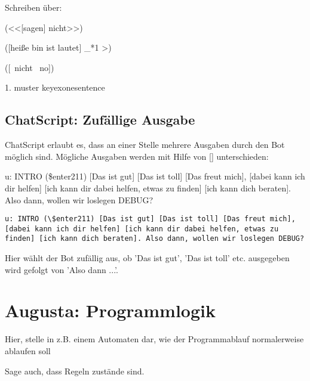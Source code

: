 Schreiben über:

(<<[sagen] nicht>>)

([heiße bin ist lautet] _*1 >)

([~nicht ~no])

1. muster keyexonesentence

\section{ChatScript: Zufällige Ausgabe}
\label{sec:ChatScript: Zufällige Ausgabe}

ChatScript erlaubt es, dass an einer Stelle mehrere Ausgaben durch den Bot möglich sind. Mögliche Ausgaben werden mit Hilfe von [] unterschieden:

u: INTRO (\$enter211) [Das ist gut] [Das ist toll] [Das freut mich], [dabei kann ich dir helfen] [ich kann dir dabei helfen, etwas zu finden] [ich kann dich beraten]. Also dann, wollen wir loslegen DEBUG?

\begin{lstlisting}[caption={Regel in keyexonesentence.top}]
u: INTRO (\$enter211) [Das ist gut] [Das ist toll] [Das freut mich], [dabei kann ich dir helfen] [ich kann dir dabei helfen, etwas zu finden] [ich kann dich beraten]. Also dann, wollen wir loslegen DEBUG?
\end{lstlisting}

Hier wählt der Bot zufällig aus, ob 'Das ist gut', 'Das ist toll' etc. ausgegeben wird gefolgt von 'Also dann ...'. 

\chapter{Augusta: Programmlogik}
\label{sec:Augusta: Programmlogik}



Hier, stelle in z.B. einem Automaten dar, wie der Programmablauf normalerweise ablaufen soll

Sage auch, dass Regeln zustände sind.

